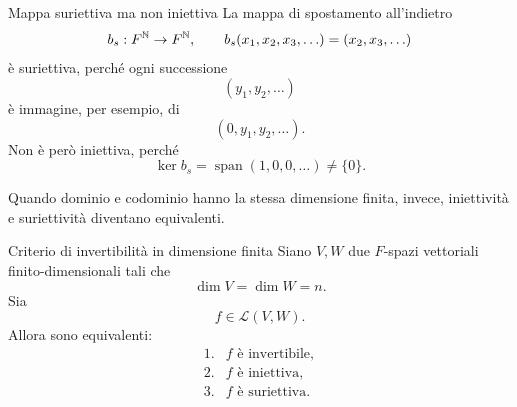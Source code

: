\documentclass[a4paper]{article}
\begin{document}
\begin{snippetexample}{Mappa suriettiva ma non iniettiva}
    La mappa di spostamento all'indietro
    \[
        b_s:F^{\mathbb{N}}\to F^{\mathbb{N}},
        \qquad
        b_s(x_1,x_2,x_3,\ldots)=(x_2,x_3,\ldots)
    \]
    è suriettiva, perché ogni successione
    \[
        (y_1,y_2,\ldots)
    \]
    è immagine, per esempio, di
    \[
        (0,y_1,y_2,\ldots).
    \]
    Non è però iniettiva, perché
    \[
        \ker b_s
        =
        \operatorname{span}(1,0,0,\ldots)
        \neq
        \{0\}.
    \]
\end{snippetexample}

Quando dominio e codominio hanno la stessa dimensione finita, invece, iniettività e suriettività diventano equivalenti.

\begin{snippettheorem}{Criterio di invertibilità in dimensione finita}
    Siano \(V,W\) due \(F\)-spazi vettoriali finito-dimensionali tali che
    \[
        \dim V=\dim W=n.
    \]
    Sia
    \[
        f\in\mathcal{L}(V,W).
    \]
    Allora sono equivalenti:
    \[
        \begin{array}{ll}
            \text{1.} & f \text{ è invertibile},\\
            \text{2.} & f \text{ è iniettiva},\\
            \text{3.} & f \text{ è suriettiva}.
        \end{array}
    \]
\end{snippettheorem}
\end{document}
